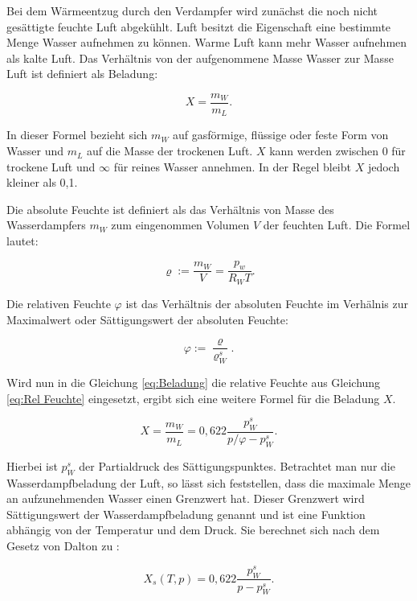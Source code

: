 Bei dem Wärmeentzug durch den Verdampfer wird  zunächst die noch nicht gesättigte feuchte Luft abgekühlt. Luft besitzt die Eigenschaft eine bestimmte Menge Wasser aufnehmen zu können. Warme Luft kann mehr Wasser aufnehmen als kalte Luft. Das Verhältnis von der aufgenommene Masse Wasser zur Masse Luft ist definiert als Beladung: 

\begin{equation}
X = \frac{m_W}{m_L}.
\label{eq:Beladung}
\end{equation}

In dieser Formel bezieht sich $m_W$ auf gasförmige, flüssige oder feste Form von Wasser und $m_L$ auf die Masse der trockenen Luft.  $X$ kann werden zwischen 0 für trockene Luft und $\infty$ für reines Wasser annehmen. In der Regel bleibt $X$ jedoch kleiner als 0,1. 

Die absolute Feuchte ist definiert als das Verhältnis von Masse des Wasserdampfers $m_W$ zum eingenommen Volumen $V$ der feuchten Luft. Die Formel lautet: 

\begin{equation}
\varrho := \frac{m_W}{V} = \frac{p_w}{R_W T}.
\label{eq:Absolute Feuchte}
\end{equation}


Die relativen Feuchte $\varphi$ ist das Verhältnis der absoluten Feuchte im Verhälnis zur Maximalwert oder Sättigungswert der absoluten Feuchte: 

\begin{equation}
 \varphi := \frac{\varrho}{\varrho_W^s}.
 \label{eq:Rel Feuchte}
\end{equation}

Wird nun in die Gleichung \ref{eq:Beladung} die relative Feuchte aus Gleichung \ref{eq:Rel Feuchte} eingesetzt, ergibt sich eine weitere Formel für die Beladung $X$. 

\begin{equation}
X = \frac{m_W}{m_L} = 0,622 \frac{p_{W}^s}{p/\varphi - p_{W}^s}.
\label{eq:Beladung 2}
\end{equation}

Hierbei ist $p_{W}^s$ der Partialdruck des Sättigungspunktes.
Betrachtet man nur die Wasserdampfbeladung der Luft, so lässt sich feststellen, dass die maximale Menge an aufzunehmenden Wasser einen Grenzwert hat. Dieser Grenzwert wird Sättigungswert der Wasserdampfbeladung genannt und ist eine Funktion abhängig von der Temperatur und dem Druck.  Sie berechnet sich nach dem Gesetz von Dalton zu :

\begin{equation}
 X_s (T,p) = 0,622 \frac{p_{W}^s}{p - p_{W}^s}.
 \label{eq:Sättigungsbeladung}
\end{equation}

